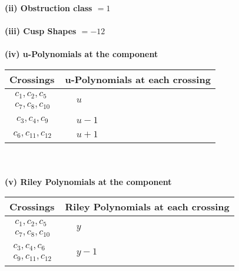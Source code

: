 \documentclass[1p]{elsarticle_modified}
\theoremstyle{definition}
\begin{document}
\flushleft \textbf{(ii) Obstruction class $= 1$}\\~\\
\flushleft \textbf{(iii) Cusp Shapes $= -12$}\\~\\
\newpage\renewcommand{\arraystretch}{1}
\flushleft \textbf{(iv) u-Polynomials at the component}\newline \\
\begin{tabular}{m{50pt}|m{274pt}}
Crossings & \hspace{64pt}u-Polynomials at each crossing \\
\hline $$\begin{aligned}c_{1},c_{2},c_{5}\\c_{7},c_{8},c_{10}\end{aligned}$$&$\begin{aligned}
&u
\end{aligned}$\\
\hline $$\begin{aligned}c_{3},c_{4},c_{9}\end{aligned}$$&$\begin{aligned}
&u-1
\end{aligned}$\\
\hline $$\begin{aligned}c_{6},c_{11},c_{12}\end{aligned}$$&$\begin{aligned}
&u+1
\end{aligned}$\\
\hline
\end{tabular}\\~\\
\newpage\renewcommand{\arraystretch}{1}
\flushleft \textbf{(v) Riley Polynomials at the component}\newline \\
\begin{tabular}{m{50pt}|m{274pt}}
Crossings & \hspace{64pt}Riley Polynomials at each crossing \\
\hline $$\begin{aligned}c_{1},c_{2},c_{5}\\c_{7},c_{8},c_{10}\end{aligned}$$&$\begin{aligned}
&y
\end{aligned}$\\
\hline $$\begin{aligned}c_{3},c_{4},c_{6}\\c_{9},c_{11},c_{12}\end{aligned}$$&$\begin{aligned}
&y-1
\end{aligned}$\\
\hline
\end{tabular}\\~\\
\end{document}
